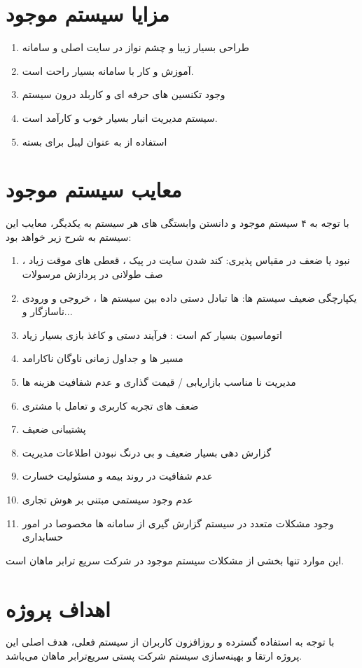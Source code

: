 \documentclass[12pt,a4paper]{report}
\begin{document}
\newpage
\section{مزایا سیستم موجود}
\begin{enumerate}
	\item طراحی  بسیار زیبا و چشم نواز در سایت اصلی و سامانه 
	\item آموزش و کار با سامانه  بسیار راحت است.
	\item وجود تکنسین های حرفه ای و کاربلد درون سیستم 
	\item سیستم مدیریت انبار بسیار خوب و کارآمد است.
	\item استفاده از  به عنوان لیبل برای بسته
\end{enumerate}
\section{ معایب سیستم موجود}

با توجه به ۴ سیستم موجود و دانستن وابستگی های هر سیستم به یکدیگر، معایب این سیستم به شرح زیر خواهد بود:

\begin{enumerate}
	\item نبود یا ضعف در مقیاس پذیری: کند شدن سایت در پیک ، قعطی های موقت زیاد ، صف طولانی در پردازش مرسولات
	\item یکپارچگی ضعیف  سیستم ها: ها تبادل دستی  داده بین سیستم ها ، خروجی و ورودی ناسازگار و...
	\item اتوماسیون بسیار کم است : فرآیند دستی و کاغذ بازی بسیار زیاد
	\item مسیر ها و جداول زمانی ناوگان ناکارامد
	\item مدیریت نا مناسب بازاریابی / قیمت گذاری و عدم شفافیت هزینه ها
	\item ضعف های تجربه کاربری  و تعامل با  مشتری
	\item پشتیبانی  ضعیف
	\item گزارش دهی بسیار ضعیف و بی درنگ نبودن اطلاعات مدیریت
	\item عدم شفافیت در روند بیمه و مسئولیت خسارت 
	\item عدم وجود سیستمی مبتنی بر هوش تجاری  
	\item وجود مشکلات متعدد در سیستم گزارش گیری از سامانه ها مخصوصا در امور حسابداری
\end{enumerate}
این موارد تنها بخشی از مشکلات سیستم موجود در شرکت سریع ترابر ماهان است. 
\section{اهداف پروژه}
با توجه به استفاده گسترده و روزافزون کاربران از سیستم فعلی، هدف اصلی این پروژه ارتقا و بهینه‌سازی سیستم   شرکت پستی سریع‌ترابر ماهان می‌باشد.
\end{document}

